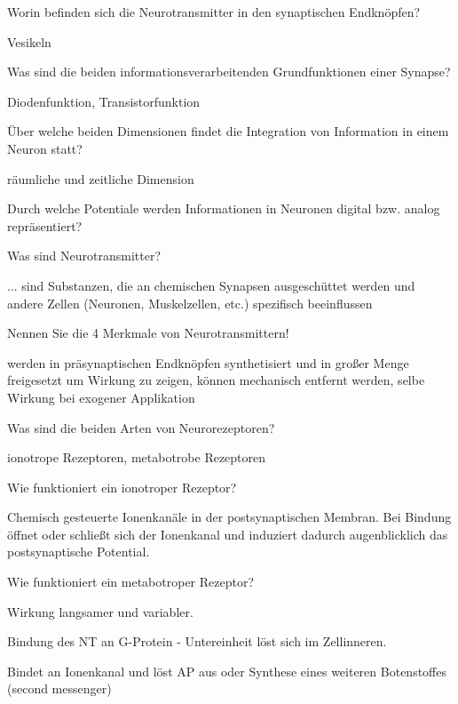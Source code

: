 \documentclass[10pt, a4paper]{exam}
\begin{document}
\begin{questions}
  \question Worin befinden sich die Neurotransmitter in den synaptischen Endknöpfen?
  \begin{solution}
    Vesikeln
  \end{solution}

  \question Was sind die beiden informationsverarbeitenden Grundfunktionen einer Synapse?
  \begin{solution}
    Diodenfunktion, Transistorfunktion
  \end{solution}

  \question Über welche beiden Dimensionen findet die Integration von Information in einem Neuron statt?
  \begin{solution}
    räumliche und zeitliche Dimension
  \end{solution}

  \question Durch welche Potentiale werden Informationen in Neuronen digital bzw. analog repräsentiert?
  \begin{solution}

  \end{solution}

  \question Was sind Neurotransmitter?
  \begin{solution}
    ... sind Substanzen, die an chemischen Synapsen ausgeschüttet werden und andere Zellen (Neuronen, Muskelzellen, etc.) spezifisch beeinflussen
  \end{solution}

  \question Nennen Sie die 4 Merkmale von Neurotransmittern!
  \begin{solution}
    werden in präsynaptischen Endknöpfen synthetisiert und in großer Menge freigesetzt um Wirkung zu zeigen, können mechanisch entfernt werden, selbe Wirkung bei exogener Applikation
  \end{solution}

  \question Was sind die beiden Arten von Neurorezeptoren?
  \begin{solution}
    ionotrope Rezeptoren, metabotrobe Rezeptoren
  \end{solution}

  \question Wie funktioniert ein ionotroper Rezeptor?
  \begin{solution}
    Chemisch gesteuerte Ionenkanäle in der postsynaptischen Membran. Bei Bindung öffnet oder schließt sich der Ionenkanal und induziert dadurch augenblicklich das postsynaptische Potential.
  \end{solution}

  \question Wie funktioniert ein metabotroper Rezeptor?
  \begin{solution}
    \begin{itemize*}
      \item Wirkung langsamer und variabler.
      \item Bindung des NT an G-Protein - Untereinheit löst sich im Zellinneren.
      \item Bindet an Ionenkanal und löst AP aus oder Synthese eines weiteren Botenstoffes (second messenger)
    \end{itemize*}
  \end{solution}


\end{questions}
\end{document}
